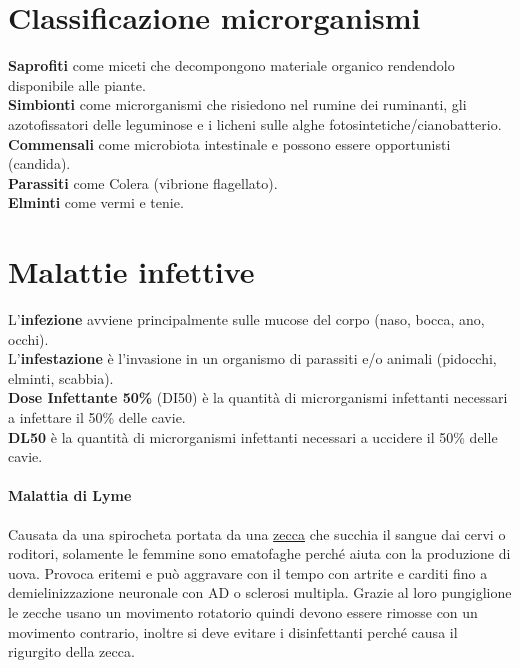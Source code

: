 \documentclass[10pt]{article}
\begin{document}
\section*{Classificazione microrganismi}
\textbf{Saprofiti} come miceti che decompongono materiale organico rendendolo disponibile alle piante.\\
\textbf{Simbionti} come microrganismi che risiedono nel rumine dei ruminanti, gli azotofissatori delle leguminose e i licheni sulle alghe fotosintetiche/cianobatterio.\\
\textbf{Commensali} come microbiota intestinale e possono essere opportunisti (candida).\\
\textbf{Parassiti} come Colera (vibrione flagellato).\\
\textbf{Elminti} come vermi e tenie. \\
\section*{Malattie infettive}
L'\textbf{infezione} avviene principalmente sulle mucose del corpo (naso, bocca, ano, occhi).\\
L'\textbf{infestazione} è l'invasione in un organismo di parassiti e/o animali (pidocchi, elminti, scabbia).\\
\textbf{Dose Infettante 50\%} (DI50) è la quantità di microrganismi infettanti necessari a infettare il 50\% delle cavie. \\
\textbf{DL50} è la quantità di microrganismi infettanti necessari a uccidere il 50\% delle cavie. \\
\paragraph*{Malattia di Lyme} Causata da una spirocheta portata da una \underline{zecca} che succhia il sangue dai cervi o roditori, solamente le femmine sono ematofaghe perché aiuta con la produzione di uova. Provoca eritemi e può aggravare con il tempo con artrite e carditi fino a demielinizzazione neuronale con AD o sclerosi multipla. Grazie al loro pungiglione le zecche usano un movimento rotatorio quindi devono essere rimosse con un movimento contrario, inoltre si deve evitare i disinfettanti perché causa il rigurgito della zecca. \\
\end{document}
